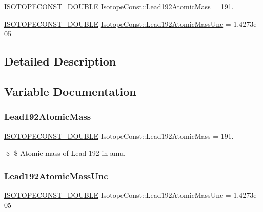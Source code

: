 \begin{DoxyCompactItemize}
\item 
\mbox{\hyperlink{group___isotope_const-_macros_ga8f45a7272ce02c0b4c65c44636ed719a}{I\+S\+O\+T\+O\+P\+E\+C\+O\+N\+S\+T\+\_\+\+D\+O\+U\+B\+LE}} \mbox{\hyperlink{group___isotope_const-_lead-_pb192_ga6ebfe15ff5999a15b8798ade5a96e620}{Isotope\+Const\+::\+Lead192\+Atomic\+Mass}} = 191.
\item 
\mbox{\hyperlink{group___isotope_const-_macros_ga8f45a7272ce02c0b4c65c44636ed719a}{I\+S\+O\+T\+O\+P\+E\+C\+O\+N\+S\+T\+\_\+\+D\+O\+U\+B\+LE}} \mbox{\hyperlink{group___isotope_const-_lead-_pb192_ga743b2a45e5e8361f2400ffada000ff50}{Isotope\+Const\+::\+Lead192\+Atomic\+Mass\+Unc}} = 1.\+4273e-\/05
\end{DoxyCompactItemize}


\subsection{Detailed Description}


\subsection{Variable Documentation}
\mbox{\label{group___isotope_const-_lead-_pb192_ga6ebfe15ff5999a15b8798ade5a96e620}} 
\subsubsection{\texorpdfstring{Lead192\+Atomic\+Mass}{Lead192AtomicMass}}
{\footnotesize\ttfamily \mbox{\hyperlink{group___isotope_const-_macros_ga8f45a7272ce02c0b4c65c44636ed719a}{I\+S\+O\+T\+O\+P\+E\+C\+O\+N\+S\+T\+\_\+\+D\+O\+U\+B\+LE}} Isotope\+Const\+::\+Lead192\+Atomic\+Mass = 191.}

\$ \$ Atomic mass of Lead-\/192 in amu. \mbox{\label{group___isotope_const-_lead-_pb192_ga743b2a45e5e8361f2400ffada000ff50}} 
\subsubsection{\texorpdfstring{Lead192\+Atomic\+Mass\+Unc}{Lead192AtomicMassUnc}}
{\footnotesize\ttfamily \mbox{\hyperlink{group___isotope_const-_macros_ga8f45a7272ce02c0b4c65c44636ed719a}{I\+S\+O\+T\+O\+P\+E\+C\+O\+N\+S\+T\+\_\+\+D\+O\+U\+B\+LE}} Isotope\+Const\+::\+Lead192\+Atomic\+Mass\+Unc = 1.\+4273e-\/05}

